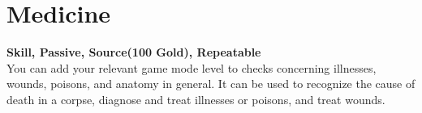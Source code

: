 \section{Medicine}\label{sec:medicine}
\textbf{Skill, Passive, Source(100 Gold), Repeatable}\\
You can add your relevant game mode level to checks concerning illnesses, wounds, poisons, and anatomy in general.
It can be used to recognize the cause of death in a corpse, diagnose and treat illnesses or poisons, and treat wounds.